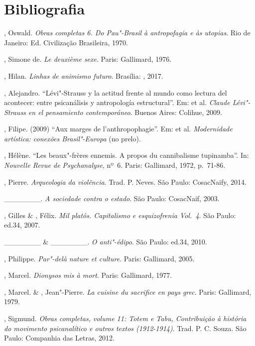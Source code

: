 \pagebreak

\section{Bibliografia}

\begin{Parskip}
, Oswald. \emph{Obras completas 6. Do Pau"-Brasil à antropofagia
e às utopias}. Rio de Janeiro: Ed. Civilização Brasileira, 1970.

, Simone de. \emph{Le deuxième sexe}. Paris: Gallimard, 1976.

, Hilan. \emph{Linhas de animismo futuro}. Brasília: , 2017.

, Alejandro. ``Lévi"-Strauss y la actitud frente al mundo como
lectura del acontecer: entre psicanálisis y antropología estructural''. Em:
 et al. \emph{Claude Lévi"-Strauss en el pensamiento
contemporáneo}. Buenos Aires: Colihue, 2009.

, Filipe. (2009) ``Aux marges de l'anthropophagie''. Em:  et al.
\emph{Modernidade artística: conexões Brasil"-Europa} (no prelo).

, Hélène. ``Les beaux"-frères ennemis. A propos du cannibalisme
tupinamba''. In: \emph{Nouvelle Revue de Psychanalyse}, nº~6. Paris:
Gallimard, 1972, p.~71-86.

, Pierre. \emph{Arqueologia da violência}. Trad. P. Neves. São
Paulo: CosacNaify, 2014.

\_\_\_\_\_\_\_. \emph{A sociedade contra o estado}. São Paulo: CosacNaif, 2003.

, Gilles \& , Félix. \emph{Mil platôs. Capitalismo e
esquizofrenia Vol.~4}. São Paulo: ed.34, 2007.

\_\_\_\_\_\_\_ \& \_\_\_\_\_\_\_. \emph{O anti"-édipo}. São Paulo: ed.34, 2010.

, Philippe. \emph{Par"-delà nature et culture}. Paris: Gallimard, 2005.

, Marcel. \emph{Dionysos mis à mort}. Paris: Gallimard, 1977.

, Marcel. \& , Jean"-Pierre. \emph{La cuisine du sacrifice en
pays grec}. Paris: Gallimard, 1979.

, Sigmund. \emph{Obras completas, volume 11: Totem e Tabu, Contribuição à história do movimento psicanalítico e outros textos (1912-1914)}. Trad. P. C. Souza. São Paulo: Companhia das Letras, 2012.


\end{Parskip}

